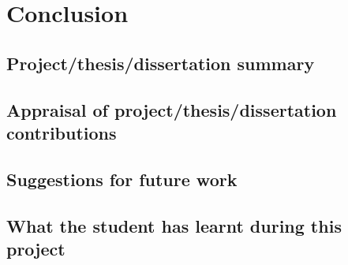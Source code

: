 \chapter{Conclusion}
\label{chap:Conclusion}



\blindtext

\section{Project/thesis/dissertation summary}

\blindtext

\blindtext

\section{Appraisal of project/thesis/dissertation contributions}

\blindtext

\section{Suggestions for future work}

\blindtext

\section{What the student has learnt during this project}		%

\blindtext